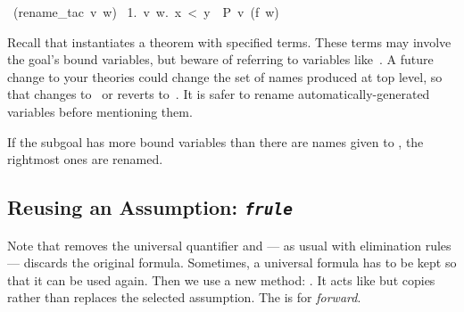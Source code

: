 \begin{isabelle}
\ (rename_tac\ v\ w)\isanewline
\ 1.\ \isasymAnd v\ w.\ x\ <\ y\ \isasymLongrightarrow \ P\ v\ (f\ w)
\end{isabelle}
Recall that  instantiates a
theorem with specified terms.  These terms may involve the goal's bound
variables, but beware of referring to  variables
like~.  A future change to your theories could change the set of names
produced at top level, so that  changes to~ or reverts to~.
It is safer to rename automatically-generated variables before mentioning them.

If the subgoal has more bound variables than there are names given to
, the rightmost ones are renamed.%


\subsection{Reusing an Assumption: {\tt\slshape frule}}

%
Note that  removes the universal quantifier and --- as
usual with elimination rules --- discards the original formula.  Sometimes, a
universal formula has to be kept so that it can be used again.  Then we use a new
method: .  It acts like  but copies rather than replaces
the selected assumption.  The  is for \emph{forward}.

